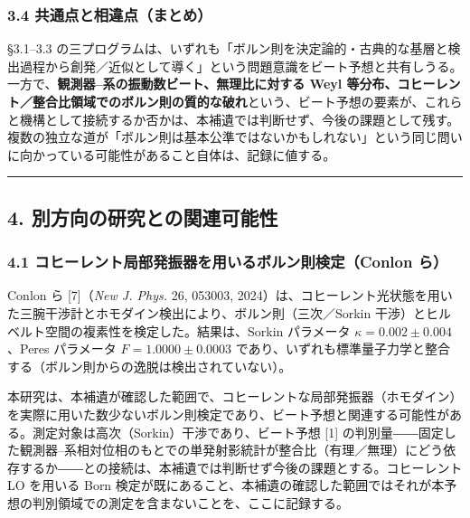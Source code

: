 \documentclass[
]{ltjsarticle}
\begin{document}
\subsubsection{3.4
共通点と相違点（まとめ）}\label{ux5171ux901aux70b9ux3068ux76f8ux9055ux70b9ux307eux3068ux3081}

§3.1--3.3
の三プログラムは、いずれも「ボルン則を決定論的・古典的な基層と検出過程から創発／近似として導く」という問題意識をビート予想と共有しうる。一方で、\textbf{観測器--系の振動数ビート、無理比に対する
Weyl
等分布、コヒーレント／整合比領域でのボルン則の質的な破れ}という、ビート予想の要素が、これらと機構として接続するか否かは、本補遺では判断せず、今後の課題として残す。複数の独立な道が「ボルン則は基本公準ではないかもしれない」という同じ問いに向かっている可能性があること自体は、記録に値する。

\begin{center}\rule{0.5\linewidth}{0.5pt}\end{center}

\subsection{4.
別方向の研究との関連可能性}\label{ux5225ux65b9ux5411ux306eux7814ux7a76ux3068ux306eux95a2ux9023ux53efux80fdux6027}

\subsubsection{4.1 コヒーレント局部発振器を用いるボルン則検定（Conlon
ら）}\label{ux30b3ux30d2ux30fcux30ecux30f3ux30c8ux5c40ux90e8ux767aux632fux5668ux3092ux7528ux3044ux308bux30dcux30ebux30f3ux5247ux691cux5b9aconlon-ux3089}

Conlon ら {[}7{]}（\emph{New J. Phys.} 26, 053003,
2024）は、コヒーレント光状態を用いた三腕干渉計とホモダイン検出により、ボルン則（三次／Sorkin
干渉）とヒルベルト空間の複素性を検定した。結果は、Sorkin パラメータ
\(\kappa = 0.002 \pm 0.004\)、Peres パラメータ \(F = 1.0000 \pm 0.0003\)
であり、いずれも標準量子力学と整合する（ボルン則からの逸脱は検出されていない）。

本研究は、本補遺が確認した範囲で、コヒーレントな局部発振器（ホモダイン）を実際に用いた数少ないボルン則検定であり、ビート予想と関連する可能性がある。測定対象は高次（Sorkin）干渉であり、ビート予想
{[}1{]}
の判別量――固定した観測器--系相対位相のもとでの単発射影統計が整合比（有理／無理）にどう依存するか――との接続は、本補遺では判断せず今後の課題とする。コヒーレント
LO を用いる Born
検定が既にあること、本補遺の確認した範囲ではそれが本予想の判別領域での測定を含まないことを、ここに記録する。
\end{document}
